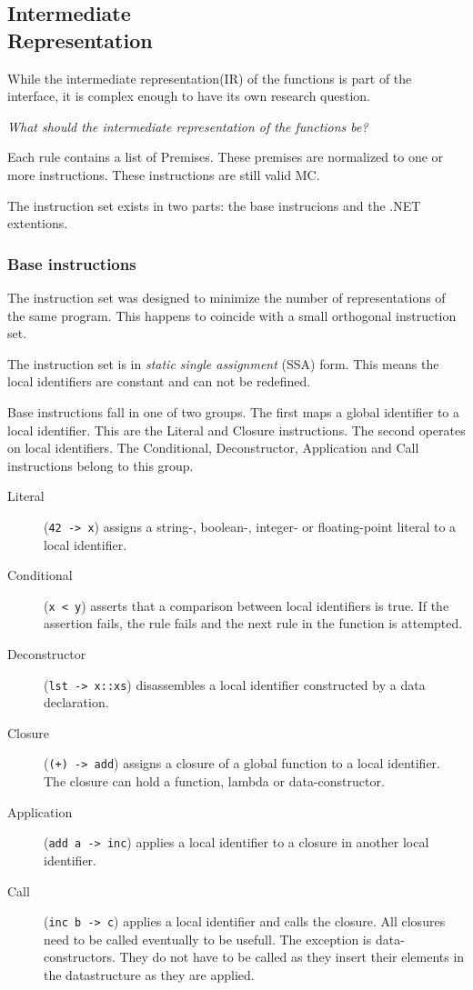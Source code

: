 \subsection[Intermediate Representation]{Intermediate\\Representation}
While the intermediate representation(IR) of the functions is part of the interface, it is complex enough to have its own research question.

\textit{What should the intermediate representation of the functions be?}

Each rule contains a list of Premises.
These premises are normalized to one or more instructions.
These instructions are still valid MC.

The instruction set exists in two parts: the base instrucions and the .NET extentions.

\subsubsection{Base instructions}
The instruction set was designed to minimize the number of representations of the same program.
This happens to coincide with a small orthogonal instruction set.

The instruction set is in \textit{static single assignment} (SSA) form.
This means the local identifiers are constant and can not be redefined.

Base instructions fall in one of two groups.
The first maps a global identifier to a local identifier.
This are the Literal and Closure instructions.
The second operates on local identifiers.
The Conditional, Deconstructor, Application and Call instructions belong to this group.

\begin{description}
\item[Literal] (\verb|42 -> x|) assigns a string-, boolean-, integer- or floating-point literal to a local identifier.
\item[Conditional] (\verb|x < y|) asserts that a comparison between local identifiers is true.
    If the assertion fails, the rule fails and the next rule in the function is attempted.
\item[Deconstructor] (\verb|lst -> x::xs|) disassembles a local identifier constructed by a data declaration.
\item[Closure] (\verb|(+) -> add|) assigns a closure of a global function to a local identifier.
    The closure can hold a function, lambda or data-constructor.
\item[Application] (\verb|add a -> inc|) applies a local identifier to a closure in another local identifier.
\item[Call] (\verb|inc b -> c|) applies a local identifier and calls the closure.
    All closures need to be called eventually to be usefull.
    The exception is data-constructors. 
    They do not have to be called as they insert their elements in the datastructure as they are applied.
\end{description}

